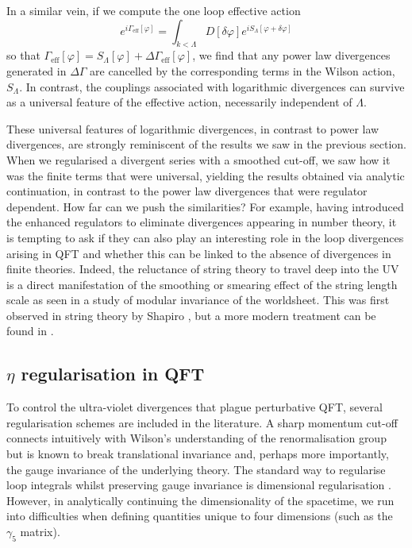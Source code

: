 \documentclass[11pt, letter]{article}
\def\be{\begin{equation}}
\def\ee{\end{equation}}
\begin{document}
In a similar vein,  if we compute the one loop effective action
\be
e^{i\Gamma_\text{eff}[\varphi]}=\int_{k<\Lambda} D [\delta \varphi]e^{iS_\Lambda[\varphi+\delta \varphi]}
\ee
so that $\Gamma_\text{eff}[\varphi]=S_\Lambda[\varphi]+\Delta \Gamma_\text{eff}[\varphi]$, we find that any power law divergences generated in $\Delta \Gamma$ are cancelled by the corresponding terms in the Wilson action, $S_\Lambda$.  In contrast, the couplings associated with logarithmic divergences can survive as a universal feature of the effective action, necessarily independent of $\Lambda$. 



These universal features of logarithmic divergences, in contrast to power law divergences,   are strongly reminiscent of the results we saw in the previous section. When we regularised a divergent series with a smoothed cut-off, we saw how it was the finite terms  that were universal,  yielding the results obtained via analytic continuation, in contrast to the power law divergences that were regulator dependent.  How far can we push the similarities? For example, having introduced the enhanced regulators to eliminate divergences  appearing in number theory, it is tempting to ask if they can also play an interesting role in the loop divergences arising in QFT and whether this can be linked to the absence of divergences in finite theories. Indeed, the reluctance of string theory to travel deep into the UV is a direct manifestation of the smoothing or smearing effect of the string length scale as seen in a study of modular invariance of the worldsheet. This was first observed in string theory by Shapiro \citep{Shapiro72}, but a more modern treatment can be found in \citep{Polchinski98}.



\subsection{$\eta$ regularisation in QFT} \label{sec:eta}

To control  the ultra-violet divergences that plague perturbative QFT, several regularisation schemes are included in the literature.  A sharp momentum cut-off connects intuitively with Wilson's understanding of the renormalisation group \cite{Kadanoff:1966wm, Wilson:1971bg,Wilson:1971dh,Wilson:1974mb} but is known to  break translational invariance and, perhaps more importantly, the gauge invariance of the underlying theory. The standard way to regularise loop integrals whilst preserving gauge invariance is dimensional regularisation \cite{tHooft:1972tcz}. However, in analytically continuing the dimensionality of the spacetime, we run into difficulties when defining quantities unique to
 four dimensions (such as the $\gamma_5$ matrix). 
 
\end{document}
